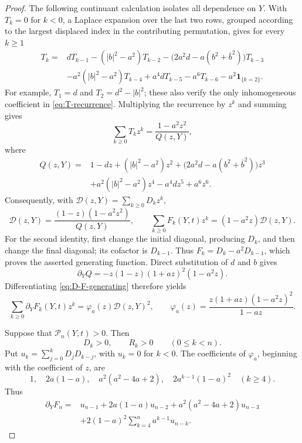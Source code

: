 \documentclass[a4paper,preprint,12pt,nopreprintline,sort&compress]{elsarticle}
\numberwithin{equation}{section}
\theoremstyle{remark}
\begin{document}
\begin{proof}
The following continuant calculation isolates all dependence on \(Y\).
With \(T_k=0\) for \(k<0\), a Laplace expansion over the last two rows,
grouped according to the largest displaced index in the contributing
permutation, gives for every \(k\geq1\)
\begin{equation}\label{eq:T-recurrence}
\begin{aligned}
T_k={}&dT_{k-1}-(|b|^2-a^2)T_{k-2}
-\bigl(2a^2d-a(b^2+\bar b^2)\bigr)T_{k-3}\\
&-a^2(|b|^2-a^2)T_{k-4}+a^4dT_{k-5}-a^6T_{k-6}
-a^2\boldsymbol 1_{\{k=2\}}.
\end{aligned}
\end{equation}
For example, \(T_1=d\) and \(T_2=d^2-|b|^2\); these also verify the
only inhomogeneous coefficient in \eqref{eq:T-recurrence}.  Multiplying
the recurrence by \(z^k\) and summing gives
\begin{equation}\label{eq:T-generating}
 \sum_{k\geq0}T_kz^k=\frac{1-a^2z^2}{Q(z,Y)},
\end{equation}
where
\[
\begin{aligned}
 Q(z,Y)={}&1-dz+(|b|^2-a^2)z^2
 +\bigl(2a^2d-a(b^2+\bar b^2)\bigr)z^3\\
 &+a^2(|b|^2-a^2)z^4-a^4dz^5+a^6z^6.
\end{aligned}
\]
Consequently, with \(\mathcal D(z,Y)=\sum_{k\geq0}D_kz^k\),
\begin{equation}\label{eq:D-F-generating}
 \mathcal D(z,Y)=\frac{(1-z)(1-a^2z^2)}{Q(z,Y)},\qquad
 \sum_{k\geq0}F_k(Y,t)z^k=(1-a^2z)\mathcal D(z,Y).
\end{equation}
For the second identity, first change the initial diagonal, producing
\(D_k\), and then change the final diagonal; its cofactor is
\(D_{k-1}\).  Thus \(F_k=D_k-a^2D_{k-1}\), which proves the asserted
generating function.  Direct substitution of \(d\) and \(b\) gives
\[
 \partial_YQ=-z(1-z)(1+az)^2(1-a^2z).
\]
Differentiating \eqref{eq:D-F-generating} therefore yields
\begin{equation}\label{eq:F-prime-generating}
 \sum_{k\geq0}\partial_YF_k(Y,t)z^k
 =\varphi_a(z)\mathcal D(z,Y)^2,
 \qquad
 \varphi_a(z)=\frac{z(1+az)(1-a^2z)^2}{1-az}.
\end{equation}

Suppose that \(\mathcal P_n(Y,t)>0\).  Then
\begin{equation}\label{eq:D-R-positive}
 D_k>0,\qquad R_k>0\qquad(0\leq k<n).
\end{equation}
Put \(u_k=\sum_{j=0}^kD_jD_{k-j}\), with \(u_k=0\) for \(k<0\).
The coefficients of \(\varphi_a\), beginning with the coefficient of
\(z\), are
\[
 1,\quad 2a(1-a),\quad a^2(a^2-4a+2),\quad
 2a^{k-1}(1-a)^2\quad(k\geq4).
\]
Thus
\begin{equation}\label{eq:F-prime-convolution}
\begin{aligned}
 \partial_YF_n={}&u_{n-1}+2a(1-a)u_{n-2}
 +a^2(a^2-4a+2)u_{n-3}\\
 &+2(1-a)^2\sum_{k=4}^na^{k-1}u_{n-k}.
\end{aligned}
\end{equation}


\end{proof}
\end{document}
